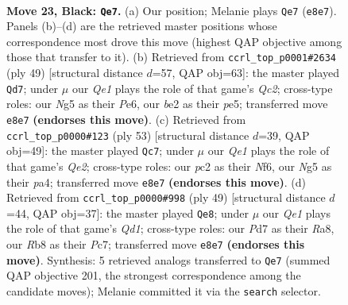 \documentclass[11pt]{article}
\begin{document}
\clearpage

\begin{figure}[p]\centering
\begin{subfigure}{0.46\textwidth}\centering
\resizebox{\linewidth}{!}{%
\newchessgame
\chessboard[
  setfen={1r2q1k1/p1pp2pp/5p2/6n1/1pPP4/3Q4/P1P1BP1P/1R4K1 b - - 1 23},
  showmover=false,
  pgfstyle=straightmove, color=movearrow, markmove={e8-e7}
]}
\caption{}
\end{subfigure}\hfill
\begin{subfigure}{0.46\textwidth}\centering
\resizebox{\linewidth}{!}{%
\newchessgame
\chessboard[
  setfen={2r3k1/2q2ppp/4p3/2p1P3/1p2Q3/1P4P1/4PPKP/2R5 b - - 3 25},
  showmover=false,
  pgfstyle=straightmove, color=movearrow, markmove={c7-d7}
]}
\caption{}
\end{subfigure}
\\[4pt]
\begin{subfigure}{0.46\textwidth}\centering
\resizebox{\linewidth}{!}{%
\newchessgame
\chessboard[
  setfen={4r1k1/pp2qpp1/2p2n1p/8/P7/1Q2P1PP/1P3PB1/3R2K1 b - - 0 27},
  showmover=false,
  pgfstyle=straightmove, color=movearrow, markmove={e7-c7}
]}
\caption{}
\end{subfigure}\hfill
\begin{subfigure}{0.46\textwidth}\centering
\resizebox{\linewidth}{!}{%
\newchessgame
\chessboard[
  setfen={r2q2k1/2p2p1p/2p3p1/8/p1P5/P4Q2/2P2PPP/3R2K1 b - - 0 25},
  showmover=false,
  pgfstyle=straightmove, color=movearrow, markmove={d8-e8}
]}
\caption{}
\end{subfigure}
\caption{\textbf{Move 23, Black: \texttt{Qe7}.} (a) Our position; Melanie plays \texttt{Qe7} (\texttt{e8e7}). Panels (b)--(d) are the retrieved master positions whose correspondence most drove this move (highest QAP objective among those that transfer to it). (b) Retrieved from \texttt{ccrl\_top\_p0001\#2634} (ply 49) [structural distance $d$=57, QAP obj=63]: the master played \texttt{Qd7}; under $\mu$ our \emph{Qe1} plays the role of that game's \emph{Qc2}; cross-type roles: our \emph{N}g5 as their \emph{P}e6, our \emph{b}e2 as their \emph{p}e5; transferred move \texttt{e8e7} \textbf{(endorses this move)}. (c) Retrieved from \texttt{ccrl\_top\_p0000\#123} (ply 53) [structural distance $d$=39, QAP obj=49]: the master played \texttt{Qc7}; under $\mu$ our \emph{Qe1} plays the role of that game's \emph{Qe2}; cross-type roles: our \emph{p}c2 as their \emph{N}f6, our \emph{N}g5 as their \emph{p}a4; transferred move \texttt{e8e7} \textbf{(endorses this move)}. (d) Retrieved from \texttt{ccrl\_top\_p0000\#998} (ply 49) [structural distance $d$=44, QAP obj=37]: the master played \texttt{Qe8}; under $\mu$ our \emph{Qe1} plays the role of that game's \emph{Qd1}; cross-type roles: our \emph{P}d7 as their \emph{R}a8, our \emph{R}b8 as their \emph{P}c7; transferred move \texttt{e8e7} \textbf{(endorses this move)}. Synthesis: 5 retrieved analogs transferred to \texttt{Qe7} (summed QAP objective 201, the strongest correspondence among the candidate moves); Melanie committed it via the \texttt{search} selector.}
\label{fig:thought-m45}
\end{figure}
\end{document}
